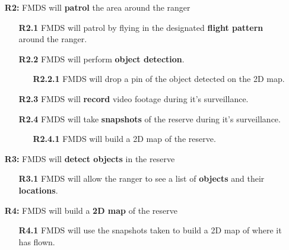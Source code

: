 \begin{flushleft}
\begin{itemize}
	\item [\textbf{R2:}] FMDS will \textbf{patrol} the area around the ranger

		\begin{itemize}
			\item [\textbf{R2.1}] FMDS will patrol by flying in the designated \textbf{flight pattern} around the ranger.
			\item [\textbf{R2.2}] FMDS will perform \textbf{object detection}.
				\begin{itemize}
					\item [\textbf{R2.2.1}] FMDS will drop a pin of the object detected on the 2D map.
				\end{itemize}
			\item [\textbf{R2.3}] FMDS will \textbf{record} video footage during it's surveillance.
			\item [\textbf{R2.4}] FMDS will take \textbf{snapshots} of the reserve during it's surveillance.
				\begin{itemize}
					\item [\textbf{R2.4.1}] FMDS will build a 2D map of the reserve.
				\end{itemize}
		\end{itemize}
\end{itemize}

\begin{itemize}
	\item  [\textbf{R3:}] FMDS will \textbf{detect objects} in the reserve

		\begin{itemize}
			\item  [\textbf{R3.1}] FMDS will allow the ranger to see a list of \textbf{objects} and their \textbf{locations}.
		\end{itemize}
\end{itemize}

\begin{itemize}
	\item  [\textbf{R4:}] FMDS will build a \textbf{2D map} of the reserve

		\begin{itemize}
			\item  [\textbf{R4.1}] FMDS will use the snapshots taken to build a 2D map of where it has flown.
		\end{itemize}
\end{itemize}
\end{flushleft}


